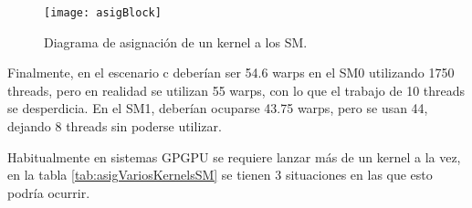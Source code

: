     \begin{figure}[ht]
      \centering
        \texttt{[image: asigBlock]}
        \caption{Diagrama de asignación de un kernel a los SM.}
        \label{fig:asigBlock}
    \end{figure}
    
    Finalmente, en el escenario c deberían ser 54.6 warps en el SM0 utilizando 1750 threads, pero en realidad se utilizan 55 warps, con lo que el trabajo de 10 threads se desperdicia. En el SM1, deberían ocuparse 43.75 warps, pero se usan 44, dejando 8 threads sin poderse utilizar.
    \newline
    
Habitualmente en sistemas GPGPU se requiere lanzar más de un kernel a la vez, en la tabla \ref{tab:asigVariosKernelsSM} se tienen 3 situaciones en las que esto podría ocurrir.
\newline

